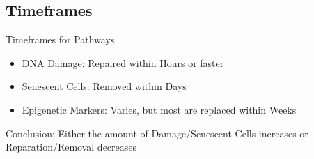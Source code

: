 \subsection{Timeframes}

\begin{frame}[c]{Timeframes for Pathways}
    \large
    \begin{itemize}[<+(1)->]
        \item DNA Damage: Repaired within Hours or faster \cite{frankenberg1989review}
        \item Senescent Cells: Removed within Days \cite{karin2018senescent}
        \item Epigenetic Markers: Varies, but most are replaced within Weeks \cite{ginno2020genome} \cite{yamagata2012rapid}
    \end{itemize}
    \pause
    Conclusion: Either the amount of Damage/Senescent Cells increases or Reparation/Removal decreases
\end{frame}



\backupend
